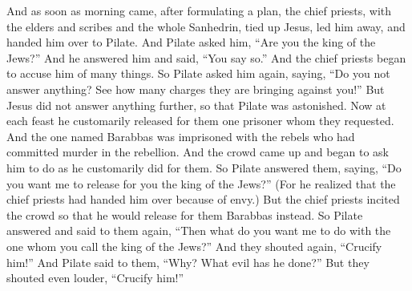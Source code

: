 \begin{biblechapter} %
 And as soon as morning came, after formulating a plan, the chief priests, with the elders and scribes and the whole Sanhedrin, tied up Jesus, led him away, and handed him over to Pilate.
\verse And Pilate asked him, “Are you the king of the Jews?” And he answered him and said, “You say so.”
\verse And the chief priests began to accuse him of many things.
\verse So Pilate asked him again, saying, “Do you not answer anything? See how many charges they are bringing against you!”
\verse But Jesus did not answer anything further, so that Pilate was astonished.
 Now at each feast he customarily released for them one prisoner whom they requested.
\verse And the one named Barabbas was imprisoned with the rebels who had committed murder in the rebellion.
\verse And the crowd came up and began to ask him to do as he customarily did for them.
\verse So Pilate answered them, saying, “Do you want me to release for you the king of the Jews?”
\verse (For he realized that the chief priests had handed him over because of envy.)
\verse But the chief priests incited the crowd so that he would release for them Barabbas instead.
\verse So Pilate answered and said to them again, “Then what do you want me to do with the one whom you call the king of the Jews?”
\verse And they shouted again, “Crucify him!”
\verse And Pilate said to them, “Why? What evil has he done?” But they shouted even louder, “Crucify him!”

\end{biblechapter}
